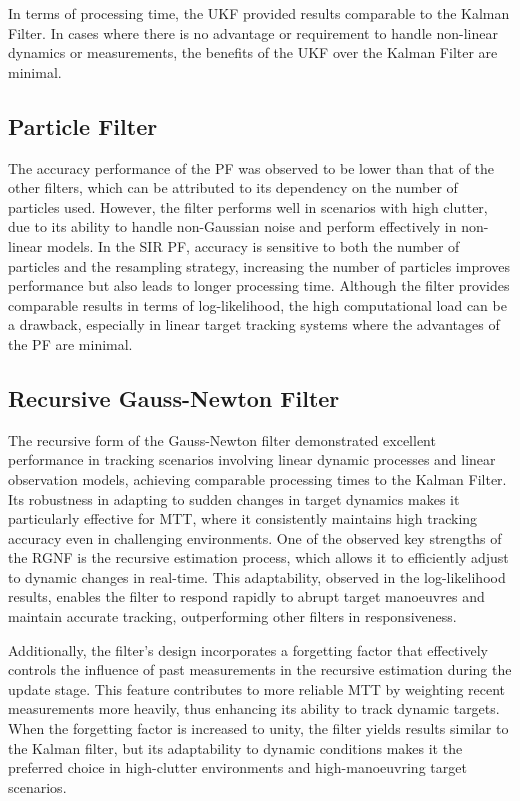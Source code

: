 In terms of processing time, the \ac{UKF} provided results comparable to the Kalman Filter. In cases where there is no advantage or requirement to handle non-linear dynamics or measurements, the benefits of the \ac{UKF} over the Kalman Filter are minimal.

\subsection{Particle Filter}
The accuracy performance of the \ac{PF} was observed to be lower than that of the other filters, which can be attributed to its dependency on the number of particles used. However, the filter performs well in scenarios with high clutter, due to its ability to handle non-Gaussian noise and perform effectively in non-linear models. In the \ac{SIR} \ac{PF}, accuracy is sensitive to both the number of particles and the resampling strategy, increasing the number of particles improves performance but also leads to longer processing time. Although the filter provides comparable results in terms of log-likelihood, the high computational load can be a drawback, especially in linear target tracking systems where the advantages of the \ac{PF} are minimal.

\subsection{Recursive Gauss-Newton Filter}
The recursive form of the Gauss-Newton filter demonstrated excellent performance in tracking scenarios involving linear dynamic processes and linear observation models, achieving comparable processing times to the Kalman Filter. Its robustness in adapting to sudden changes in target dynamics makes it particularly effective for \ac{MTT}, where it consistently maintains high tracking accuracy even in challenging environments. One of the observed key strengths of the \ac{RGNF} is the recursive estimation process, which allows it to efficiently adjust to dynamic changes in real-time. This adaptability, observed in the log-likelihood results, enables the filter to respond rapidly to abrupt target manoeuvres and maintain accurate tracking, outperforming other filters in responsiveness. 

Additionally, the filter’s design incorporates a forgetting factor that effectively controls the influence of past measurements in the recursive estimation during the update stage. This feature contributes to more reliable \ac{MTT} by weighting recent measurements more heavily, thus enhancing its ability to track dynamic targets. When the forgetting factor is increased to unity, the filter yields results similar to the Kalman filter, but its adaptability to dynamic conditions makes it the preferred choice in high-clutter environments and high-manoeuvring target scenarios.

